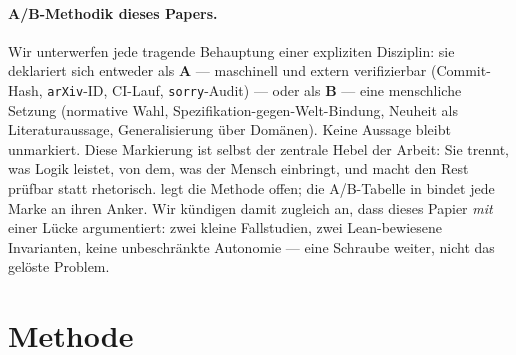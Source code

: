 \documentclass[11pt,a4paper]{article}
\newcommand{\AB}[1]{\textbf{#1}}
\theoremstyle{definition}
\theoremstyle{remark}
\begin{document}
\paragraph{A/B-Methodik dieses Papers.}
Wir unterwerfen jede tragende Behauptung einer expliziten Disziplin: sie deklariert sich
entweder als \AB{A} --- maschinell und extern verifizierbar (Commit-Hash, \texttt{arXiv}-ID,
CI-Lauf, \texttt{sorry}-Audit) --- oder als \AB{B} --- eine menschliche Setzung
(normative Wahl, Spezifikation-gegen-Welt-Bindung, Neuheit als Literaturaussage,
Generalisierung über Domänen). Keine Aussage bleibt unmarkiert. Diese Markierung ist selbst
der zentrale Hebel der Arbeit: Sie trennt, was Logik leistet, von dem, was der Mensch
einbringt, und macht den \glqq Rest\grqq{} prüfbar statt rhetorisch.  legt die
Methode offen; die A/B-Tabelle in  bindet jede Marke an ihren Anker.
Wir kündigen damit zugleich an, dass dieses Papier \emph{mit} einer Lücke argumentiert: zwei
kleine Fallstudien, zwei Lean-bewiesene Invarianten, keine unbeschränkte Autonomie ---
eine Schraube weiter, nicht das gelöste Problem.

\section{Methode}
\label{sec:methode}
\end{document}
